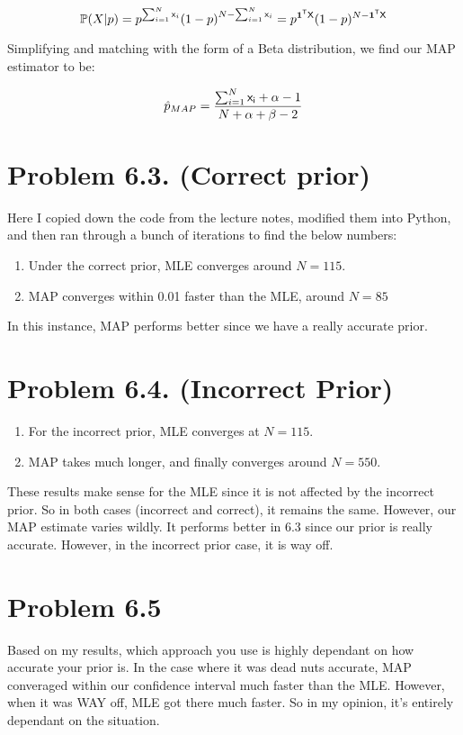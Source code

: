 \documentclass{article}
\begin{document}
\[ \mathbb{P}(X|p) = p^{\sum_{i=1}^{N} {\sf{x}}_i} (1 - p)^{N - \sum_{i=1}^{N} {\sf{x}}_i} =  p^{\textbf{1}^{{\sf{T}}}{\sf{X}}} (1 - p)^{N-\textbf{1}^{{\sf{T}}}{\sf{X}}} \]

Simplifying and matching with the form of a Beta distribution, we find our MAP estimator to be:

\[ \hat{p}_{MAP} = \frac{\sum_{i=1}^{N} {\sf{x}_i} + \alpha - 1}{N + \alpha + \beta - 2} \]

\section*{Problem 6.3. (Correct prior)}
  Here I copied down the code from the lecture notes, modified them into Python, and then ran through a bunch of iterations to find the below numbers:
  \begin{enumerate}[label=(\alph*)]
    \item Under the correct prior, MLE converges around $N = 115$.
    \item MAP converges within 0.01 faster than the MLE, around $N = 85$ 
  \end{enumerate}

  In this instance, MAP performs better since we have a really accurate prior.

\section*{Problem 6.4. (Incorrect Prior)}

  \begin{enumerate}[label=(\alph*)]
    \item For the incorrect prior, MLE converges at $N = 115$. 
    \item MAP takes much longer, and finally converges around $N = 550$.
  \end{enumerate}

  These results make sense for the MLE since it is not affected by the incorrect prior. So in both cases (incorrect and correct), it remains the same. However, our MAP estimate varies wildly. It performs better in 6.3 since our prior is really accurate. However, in the incorrect prior case, it is way off. 

\section*{Problem 6.5}
Based on my results, which approach you use is highly dependant on how accurate your prior is. In the case where it was dead nuts accurate, MAP converaged within our confidence interval much faster than the MLE. However, when it was WAY off, MLE got there much faster. So in my opinion, it's entirely dependant on the situation.
\end{document}
